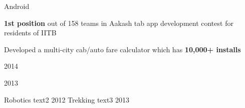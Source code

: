 \begin{fancyextracurrics}
%
%
\fancycurric
{Android}
{%
\begin{cvplainitems}
    \item {\textbf{1st position} out of 158 teams in Aakash tab app development contest for residents of IITB}
    \item {Developed a multi-city cab/auto fare calculator which has \textbf{10,000+ installs}}
\end{cvplainitems}
}
{%
\begin{cvnobullets}
    \item {2014}
    \item {2013}
\end{cvnobullets}
}
%
%
\fancycurric
{Robotics}
{text2}
{2012}
%
%
\fancycurriclast
{Trekking}
{text3}
{2013}
\end{fancyextracurrics}
